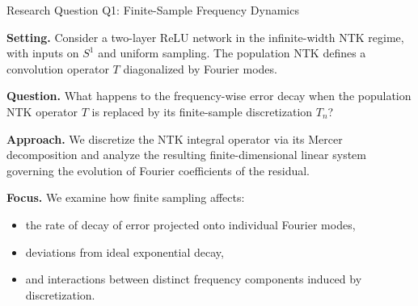 \documentclass[10pt,aspectratio=169]{beamer}
\begin{document}
\begin{frame}{Research Question Q1: Finite-Sample Frequency Dynamics}

	\textbf{Setting.}
	Consider a two-layer ReLU network in the infinite-width NTK regime, with inputs on
	$S^1$ and uniform sampling.
	The population NTK defines a convolution operator $T$ diagonalized by Fourier modes.

	\vspace{0.5em}

	\textbf{Question.}
	What happens to the frequency-wise error decay when the population NTK operator $T$
	is replaced by its finite-sample discretization $T_n$?

	\vspace{0.5em}
	\pause

	\textbf{Approach.}
	We discretize the NTK integral operator via its Mercer decomposition and analyze the
	resulting finite-dimensional linear system governing the evolution of Fourier
	coefficients of the residual.

	\vspace{0.5em}

	\textbf{Focus.}
	We examine how finite sampling affects:
	\begin{itemize}
		\item the rate of decay of error projected onto individual Fourier modes,
		\item deviations from ideal exponential decay,
		\item and interactions between distinct frequency components induced by discretization.
	\end{itemize}

\end{frame}
\end{document}
